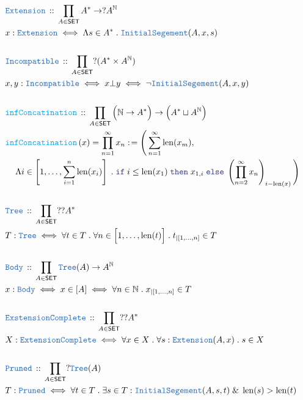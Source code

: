 \documentclass[12pt]{scrartcl}
\newcommand{\TYPE}[1]{\textcolor{NavyBlue}{\mathtt{#1}}}
\newcommand{\FUNC}[1]{\textcolor{Cerulean}{\mathtt{#1}}}
\newcommand{\LOGIC}[1]{\textcolor{Blue}{\mathtt{#1}}}
\renewcommand{\.}{\; . \;}
\newcommand{\de}{: \kern 0.1pc =}
\newcommand{\If}{\LOGIC{if} \;}
\newcommand{\Then}{ \; \LOGIC{then} \;}
\newcommand{\Else}{\; \LOGIC{else} \;}
\newcommand{\Act}[1]{\left( #1 \right)}
\newcommand{\DeclareType}[2]{& \TYPE{#1} \, :: \, #2 \\}
\newcommand{\DefineType}[3]{& #1 : \TYPE{#2} \iff #3 \\}
\newcommand{\DefineNamedType}[4]{& #1 : \TYPE{#2} \iff #3 \iff #4 \\}
\newcommand{\DeclareFunc}[2]{& \FUNC{#1} \, :: \, #2 \\}
\newcommand{\DefineNamedFunc}[4]{&  \FUNC{#1}\Act{#2} = #3 \de #4 \\}
\newcommand{\NewLine}{\\ & \kern 1pc}
\newcommand{\Page}[1]{ \begin{align*} #1 \end{align*}   }
\renewcommand{\And}{\; \& \;}
\newcommand{\Nat}{\mathbb{N} }
\newcommand{\SET}{\mathsf{SET}}
\newcommand{\IS}{\TYPE{InitialSegement}}
\newcommand{\FS}[1]{{#1}{}^*}
\newcommand{\Ext}{\TYPE{Extension}}
\newcommand{\Tree}{\TYPE{Tree}}
\DeclareMathOperator{\len}{len}
\newcommand{\inits}[2]{{#1}_{|\left[1,\ldots,#2\right]}}
\begin{document}
\Page{
	\DeclareType{\Ext}
	{  
		\prod_{A \in \SET} \FS{A} \to ?A^\Nat
	}
	\DefineType{x}{\Ext}{\Lambda s \in \FS{A} \. \IS(A,x,s)}
	\\
	\DeclareType{Incompatible}{\prod_{A \in \SET} ?(\FS{A}\times A^\Nat)}
	\DefineNamedType{x,y}{Incompatible}{x \bot y}{ \neg \IS(A,x,y)   }
	\\
	\DeclareFunc{infConcatination}{ \prod_{A \in \SET} \Big(\Nat \to  \FS{A}\Big) \to \Big(\FS{A} \sqcup A^\Nat\Big)}
	\DefineNamedFunc{infConcatination}{x}{\prod^\infty_{n=1} x_n}{ 
		\Bigg( \sum^\infty_{n=1} \len(x_m), \NewLine
			\Lambda i \in \left[1,\ldots, \sum^n_{i=1} \len(x_i) \right] \.
			\If i \le \len(x_1) \Then x_{1,i} \Else  \left( \prod^\infty_{n=2} x_n \right)_{i-\len(x)}
		\Bigg)
	}
	\\
	\DeclareType{\Tree}{\prod_{A \in \SET} ??\FS{A} }
	\DefineType{T}{\Tree}{\forall t \in T \. \forall n \in \Big[1,\ldots,\len(t)\Big] \. \inits{t}{n} \in T}
	\\
	\DeclareType{Body}{\prod_{A \in \SET} \Tree(A) \to A^\Nat}
	\DefineNamedType{x}{Body}{x \in [A]}{\forall n \in \Nat \. \inits{x}{n} \in T}
	\\
	\DeclareType{ExstensionComplete}{\prod_{A \in \SET} ??\FS{A}}
	\DefineType{X}{ExtensionComplete}{\forall x \in X \. \forall s : \Ext(A,x) \. s \in X}
	\\
	\DeclareType{Pruned}{\prod_{A \in \SET} ?\Tree(A)}
	\DefineType{T}{Pruned}{\forall t \in T \. \exists s \in T : \IS(A,s,t) \And \len(s) > \len(t)}
}
\newpage
\end{document}
